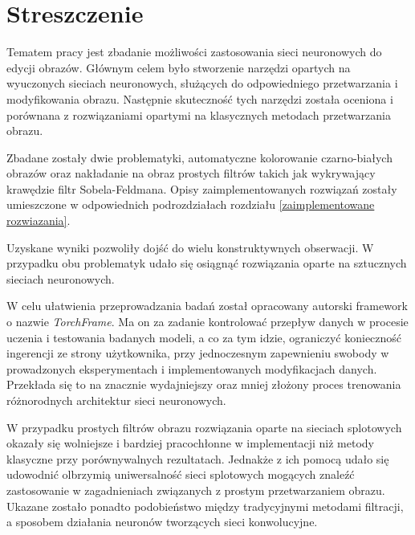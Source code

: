 \section*{Streszczenie}

  Tematem pracy jest zbadanie możliwości zastosowania sieci neuronowych do
  edycji obrazów. Głównym celem było stworzenie narzędzi opartych na wyuczonych
  sieciach neuronowych, służących do odpowiedniego przetwarzania i
  modyfikowania obrazu. Następnie skuteczność tych narzędzi została oceniona i
  porównana z rozwiązaniami opartymi na klasycznych metodach przetwarzania obrazu.

  Zbadane zostały dwie problematyki, automatyczne kolorowanie czarno-białych obrazów
  oraz nakładanie na obraz prostych filtrów takich jak wykrywający
  krawędzie filtr Sobela-Feldmana. Opisy zaimplementowanych rozwiązań zostały
  umieszczone w odpowiednich podrozdziałach
  rozdziału \ref{zaimplementowane rozwiazania}.

  Uzyskane wyniki pozwoliły dojść do wielu konstruktywnych obserwacji. W przypadku obu
  problematyk udało się osiągnąć rozwiązania oparte na sztucznych sieciach
  neuronowych.

  W celu ułatwienia przeprowadzania badań został opracowany autorski framework
  o nazwie \textit{TorchFrame}. Ma on za zadanie kontrolować
  przepływ danych w procesie uczenia i testowania badanych modeli, a co za tym
  idzie, ograniczyć konieczność ingerencji ze strony użytkownika, przy jednoczesnym
  zapewnieniu swobody w prowadzonych eksperymentach i implementowanych modyfikacjach danych. Przekłada
  się to na znacznie wydajniejszy oraz mniej złożony proces trenowania
  różnorodnych architektur sieci neuronowych.

  W przypadku prostych filtrów obrazu rozwiązania
  oparte na sieciach splotowych okazały się wolniejsze i bardziej pracochłonne w
  implementacji niż metody klasyczne przy porównywalnych rezultatach. Jednakże
  z ich pomocą udało się udowodnić olbrzymią uniwersalność sieci splotowych
  mogących znaleźć zastosowanie w zagadnieniach związanych z prostym
  przetwarzaniem obrazu. Ukazane zostało ponadto podobieństwo między tradycyjnymi
  metodami filtracji, a sposobem działania neuronów tworzących sieci konwolucyjne.

